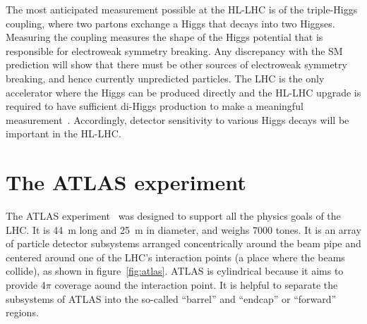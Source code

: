 The most anticipated measurement possible at the HL-LHC is of the triple-Higgs coupling, where two partons exchange a Higgs that decays into two Higgses. Measuring the coupling measures the shape of the Higgs potential that is responsible for electroweak symmetry breaking. Any discrepancy with the SM prediction will show that there must be other sources of electroweak symmetry breaking, and hence currently unpredicted particles. The LHC is the only accelerator where the Higgs can be produced directly and the HL-LHC upgrade is required to have sufficient di-Higgs production to make a meaningful measurement~\cite{dainese_physics_2018, cepeda_report_2018}. Accordingly, detector sensitivity to various Higgs decays will be important in the HL-LHC.


\section{The ATLAS experiment}
\label{sec:atlas}

The ATLAS experiment~\cite{collaboration_atlas_2008} was designed to support all the physics goals of the LHC. It is \SI{44}{\meter} long and \SI{25}{\meter} in diameter, and weighs 7000 tones. It is an array of particle detector subsystems arranged concentrically around the beam pipe and centered around one of the LHC's interaction points (a place where the beams collide), as shown in figure~\ref{fig:atlas}. ATLAS is cylindrical because it aims to provide 4$\pi$ coverage aound the interaction point. It is helpful to separate the subsystems of ATLAS into the so-called ``barrel'' and ``endcap'' or ``forward'' regions.  %

